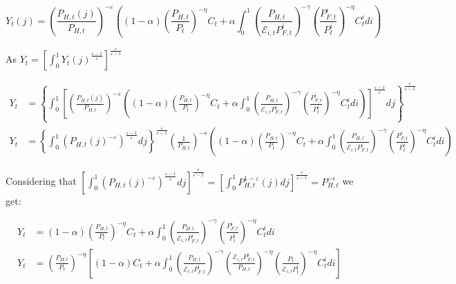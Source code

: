\documentclass{article}
\begin{document}
\begin{equation}
    Y_{t}(j) = \left( \frac{P_{H,t}(j)}{P_{H,t}} \right)^{-\varepsilon} \left((1-\alpha) \left( \frac{P_{H,t}}{P_t} \right)^{-\eta} C_t +  \alpha \int_0^1 \left( \frac{P_{H,t}}{\mathcal{E}_{i,t} P^i_{F,t}} \right)^{-\gamma} \left( \frac{P^i_{F,t}}{P^i_{t}} \right)^{-\eta} C^i_t di \right)
\end{equation}

As $Y_t = \left[\int^1_0 Y_t(j)^{\frac{\varepsilon-1}{\varepsilon}} \right]^\frac{\varepsilon}{\varepsilon-1}$

\begin{equation}
    \label{}
    \begin{split}
    Y_{t} &= \left\{ \int^1_0 \left[ \left( \frac{P_{H,t}(j)}{P_{H,t}} \right)^{-\varepsilon} \left((1-\alpha) \left( \frac{P_{H,t}}{P_t} \right)^{-\eta} C_t +  \alpha \int_0^1 \left( \frac{P_{H,t}}{\mathcal{E}_{i,t} P^i_{F,t}} \right)^{-\gamma} \left( \frac{P^i_{F,t}}{P^i_{t}} \right)^{-\eta} C^i_t di \right)\right]^{\frac{\varepsilon-1}{\varepsilon}}dj \right\}^\frac{\varepsilon}{\varepsilon-1}\\
    Y_{t} &= \left\{ \int^1_0 \left( P_{H,t}(j)^{-\varepsilon} \right)^{\frac{\varepsilon-1}{\varepsilon}}dj \right\}^\frac{\varepsilon}{\varepsilon-1} \left(\frac{1}{P_{H,t}}\right)^{-\epsilon} \left((1-\alpha) \left( \frac{P_{H,t}}{P_t} \right)^{-\eta} C_t +  \alpha \int_0^1 \left( \frac{P_{H,t}}{\mathcal{E}_{i,t} P^i_{F,t}} \right)^{-\gamma} \left( \frac{P^i_{F,t}}{P^i_{t}} \right)^{-\eta} C^i_t di \right)
    \end{split}
\end{equation}


Considering that $\left[ \int^1_0 \left( P_{H,t}(j)^{-\varepsilon} \right)^{\frac{\varepsilon-1}{\varepsilon}}dj \right]^\frac{\varepsilon}{\varepsilon-1} = \left[ \int^1_0 P_{H,t}^{1-\varepsilon}(j)  dj \right]^\frac{\varepsilon}{\varepsilon-1} = P_{H,t}^{-\epsilon}$ we get:

\begin{equation}
    \begin{split}
        Y_{t} &= (1-\alpha) \left( \frac{P_{H,t}}{P_t} \right)^{-\eta} C_t +  \alpha \int_0^1 \left( \frac{P_{H,t}}{\mathcal{E}_{i,t} P^i_{F,t}} \right)^{-\gamma} \left( \frac{P^i_{F,t}}{P^i_{t}} \right)^{-\eta} C^i_t di \\
        Y_{t} &= \left( \frac{P_{H,t}}{P_t} \right)^{-\eta} \left[(1-\alpha)  C_t +  \alpha \int_0^1 \left( \frac{P_{H,t}}{\mathcal{E}_{i,t} P^i_{F,t}} \right)^{-\gamma}  \left( \frac{\mathcal{E}_{i,t} P^i_{F,t}}{P_{H,t}} \right)^{-\eta} \left(\frac{P_t}{\mathcal E_{i,t} P_t^i} \right)^{-\eta} C^i_t di \right]
    \end{split}
\end{equation}
\end{document}
